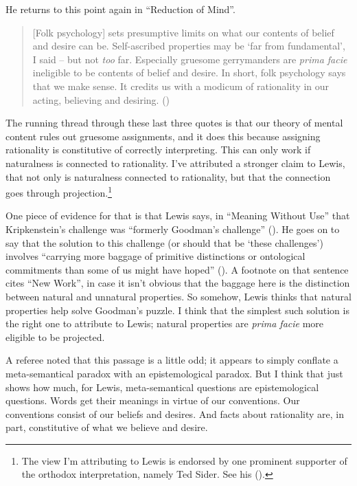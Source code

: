 \documentclass[
  10pt,
  letterpaper,
  DIV=11,
  numbers=noendperiod,
  twoside]{scrartcl}
\begin{document}
He returns to this point again in ``Reduction of Mind''.

\begin{quote}
{[}Folk psychology{]} sets presumptive limits on what our contents of
belief and desire can be. Self-ascribed properties may be `far from
fundamental', I said -- but not \emph{too} far. Especially gruesome
gerrymanders are \emph{prima facie} ineligible to be contents of belief
and desire. In short, folk psychology says that we make sense. It
credits us with a modicum of rationality in our acting, believing and
desiring. ()
\end{quote}

The running thread through these last three quotes is that our theory of
mental content rules out gruesome assignments, and it does this because
assigning rationality is constitutive of correctly interpreting. This
can only work if naturalness is connected to rationality. I've
attributed a stronger claim to Lewis, that not only is naturalness
connected to rationality, but that the connection goes through
projection.\footnote{The view I'm attributing to Lewis is endorsed by
  one prominent supporter of the orthodox interpretation, namely Ted
  Sider. See his ().}

One piece of evidence for that is that Lewis says, in ``Meaning Without
Use'' that Kripkenstein's challenge was ``formerly Goodman's challenge''
(). He goes on to say that the
solution to this challenge (or should that be `these challenges')
involves ``carrying more baggage of primitive distinctions or
ontological commitments than some of us might have hoped''
(). A footnote on that
sentence cites ``New Work'', in case it isn't obvious that the baggage
here is the distinction between natural and unnatural properties. So
somehow, Lewis thinks that natural properties help solve Goodman's
puzzle. I think that the simplest such solution is the right one to
attribute to Lewis; natural properties are \emph{prima facie} more
eligible to be projected.

A referee noted that this passage is a little odd; it appears to simply
conflate a meta-semantical paradox with an epistemological paradox. But
I think that just shows how much, for Lewis, meta-semantical questions
are epistemological questions. Words get their meanings in virtue of our
conventions. Our conventions consist of our beliefs and desires. And
facts about rationality are, in part, constitutive of what we believe
and desire.
\end{document}

